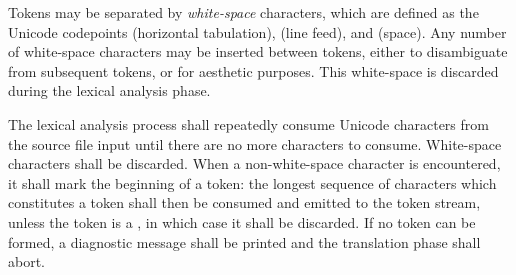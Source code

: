 \specsubitem
Tokens may be separated by \textit{white-space} characters, which are defined as
the Unicode codepoints  (horizontal tabulation), 
(line feed), and  (space). Any number of white-space characters may
be inserted between tokens, either to disambiguate from subsequent tokens, or
for aesthetic purposes. This white-space is discarded during the lexical
analysis phase.


\specsubitem
The lexical analysis process shall repeatedly consume Unicode characters from
the source file input until there are no more characters to consume. White-space
characters shall be discarded. When a non-white-space character is encountered,
it shall mark the beginning of a token: the longest sequence of characters which
constitutes a token shall then be consumed and emitted to the token stream,
unless the token is a , in which case it shall be
discarded. If no token can be formed, a diagnostic message shall be printed and
the translation phase shall abort.
